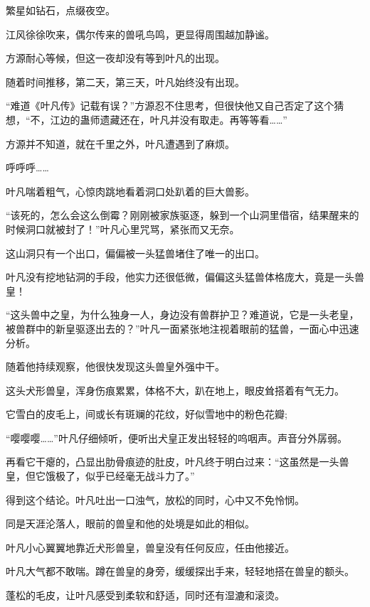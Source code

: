 
\begin{this_body}



繁星如钻石，点缀夜空。

江风徐徐吹来，偶尔传来的兽吼鸟鸣，更显得周围越加静谧。

方源耐心等候，但这一夜却没有等到叶凡的出现。

随着时间推移，第二天，第三天，叶凡始终没有出现。

“难道《叶凡传》记载有误？”方源忍不住思考，但很快他又自己否定了这个猜想，“不，江边的蛊师遗藏还在，叶凡并没有取走。再等等看……”

方源并不知道，就在千里之外，叶凡遭遇到了麻烦。

呼呼呼……

叶凡喘着粗气，心惊肉跳地看着洞口处趴着的巨大兽影。

“该死的，怎么会这么倒霉？刚刚被家族驱逐，躲到一个山洞里借宿，结果醒来的时候洞口就被封了！”叶凡心里咒骂，紧张而又无奈。

这山洞只有一个出口，偏偏被一头猛兽堵住了唯一的出口。

叶凡没有挖地钻洞的手段，他实力还很低微，偏偏这头猛兽体格庞大，竟是一头兽皇！

“这头兽中之皇，为什么独身一人，身边没有兽群护卫？难道说，它是一头老皇，被兽群中的新皇驱逐出去的？”叶凡一面紧张地注视着眼前的猛兽，一面心中迅速分析。

随着他持续观察，他很快发现这头兽皇外强中干。

这头犬形兽皇，浑身伤痕累累，体格不大，趴在地上，眼皮耸搭着有气无力。

它雪白的皮毛上，间或长有斑斓的花纹，好似雪地中的粉色花瓣;

“嘤嘤嘤……”叶凡仔细倾听，便听出犬皇正发出轻轻的呜咽声。声音分外孱弱。

再看它干瘪的，凸显出肋骨痕迹的肚皮，叶凡终于明白过来：“这虽然是一头兽皇，但它饿极了，似乎已经毫无战斗力了。”

得到这个结论。叶凡吐出一口浊气，放松的同时，心中又不免怜悯。

同是天涯沦落人，眼前的兽皇和他的处境是如此的相似。

叶凡小心翼翼地靠近犬形兽皇，兽皇没有任何反应，任由他接近。

叶凡大气都不敢喘。蹲在兽皇的身旁，缓缓探出手来，轻轻地搭在兽皇的额头。

蓬松的毛皮，让叶凡感受到柔软和舒适，同时还有湿漉和滚烫。


\end{this_body}

